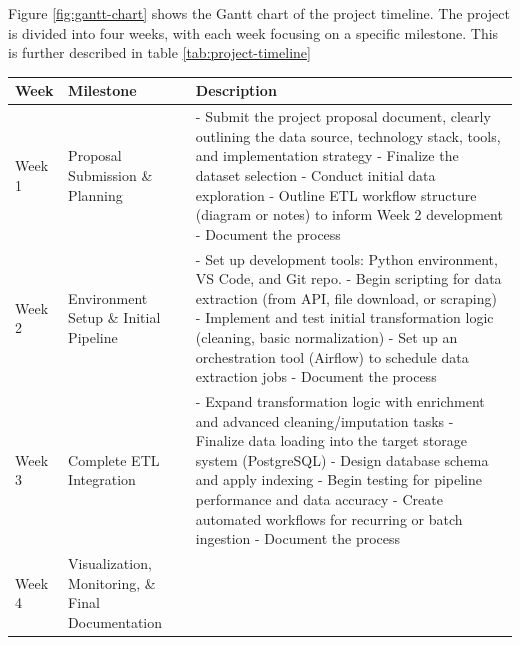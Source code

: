 \documentclass{article}
\begin{document}
Figure \ref{fig:gantt-chart} shows the Gantt chart of the project timeline. The project is divided into four weeks, with each week focusing on a specific milestone. This is further described in table \ref{tab:project-timeline}
\begin{longtable}{|L{2cm}|L{3cm}|L{10cm}|}
    \hline 
    \textbf{Week} & \textbf{Milestone} & \textbf{Description} \\
    \hline
    Week 1 & Proposal Submission \& Planning &
    
    - Submit the project proposal document, clearly outlining the data source, technology stack, tools, and implementation strategy\newline
    - Finalize the dataset selection\newline
    - Conduct initial data exploration\newline
    - Outline ETL workflow structure (diagram or notes) to inform Week 2 development\newline
    - Document the process
       \\
    \hline
    Week 2 & Environment Setup \& Initial Pipeline &
    
    - Set up development tools: Python environment, VS Code, and Git repo.\newline
    - Begin scripting for data extraction (from API, file download, or scraping)\newline
    - Implement and test initial transformation logic (cleaning, basic normalization)\newline
    - Set up an orchestration tool (Airflow) to schedule data extraction jobs\newline
    - Document the process
    \\
    \hline
    Week 3 & Complete ETL Integration &
    
    - Expand transformation logic with enrichment and advanced cleaning/imputation tasks\newline
    - Finalize data loading into the target storage system (PostgreSQL)\newline
    - Design database schema and apply indexing\newline
    - Begin testing for pipeline performance and data accuracy\newline
    - Create automated workflows for recurring or batch ingestion\newline
    - Document the process
    \\
    \hline
    Week 4 & Visualization, Monitoring, \& Final Documentation &
    

\end{longtable}
\end{document}
